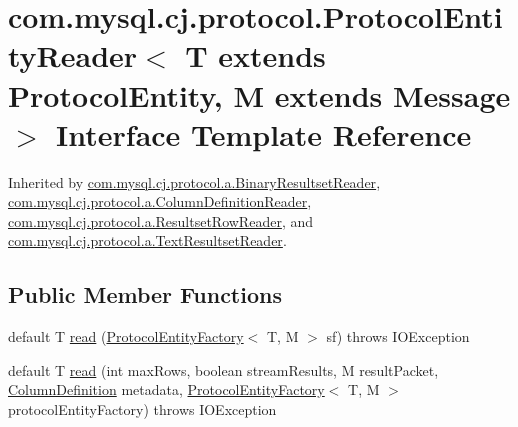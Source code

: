 \hypertarget{interfacecom_1_1mysql_1_1cj_1_1protocol_1_1_protocol_entity_reader}{}\section{com.\+mysql.\+cj.\+protocol.\+Protocol\+Entity\+Reader$<$ T extends Protocol\+Entity, M extends Message $>$ Interface Template Reference}
\label{interfacecom_1_1mysql_1_1cj_1_1protocol_1_1_protocol_entity_reader}


Inherited by \mbox{\hyperlink{classcom_1_1mysql_1_1cj_1_1protocol_1_1a_1_1_binary_resultset_reader}{com.\+mysql.\+cj.\+protocol.\+a.\+Binary\+Resultset\+Reader}}, \mbox{\hyperlink{classcom_1_1mysql_1_1cj_1_1protocol_1_1a_1_1_column_definition_reader}{com.\+mysql.\+cj.\+protocol.\+a.\+Column\+Definition\+Reader}}, \mbox{\hyperlink{classcom_1_1mysql_1_1cj_1_1protocol_1_1a_1_1_resultset_row_reader}{com.\+mysql.\+cj.\+protocol.\+a.\+Resultset\+Row\+Reader}}, and \mbox{\hyperlink{classcom_1_1mysql_1_1cj_1_1protocol_1_1a_1_1_text_resultset_reader}{com.\+mysql.\+cj.\+protocol.\+a.\+Text\+Resultset\+Reader}}.

\subsection*{Public Member Functions}
\begin{DoxyCompactItemize}
\item 
default T \mbox{\hyperlink{interfacecom_1_1mysql_1_1cj_1_1protocol_1_1_protocol_entity_reader_ade53e887e76108322ed04525b6d38321}{read}} (\mbox{\hyperlink{interfacecom_1_1mysql_1_1cj_1_1protocol_1_1_protocol_entity_factory}{Protocol\+Entity\+Factory}}$<$ T, M $>$ sf)  throws I\+O\+Exception 
\item 
default T \mbox{\hyperlink{interfacecom_1_1mysql_1_1cj_1_1protocol_1_1_protocol_entity_reader_a17198032f8f4fb36d3e46dca3ec17b93}{read}} (int max\+Rows, boolean stream\+Results, M result\+Packet, \mbox{\hyperlink{interfacecom_1_1mysql_1_1cj_1_1protocol_1_1_column_definition}{Column\+Definition}} metadata, \mbox{\hyperlink{interfacecom_1_1mysql_1_1cj_1_1protocol_1_1_protocol_entity_factory}{Protocol\+Entity\+Factory}}$<$ T, M $>$ protocol\+Entity\+Factory)  throws I\+O\+Exception 
\end{DoxyCompactItemize}


